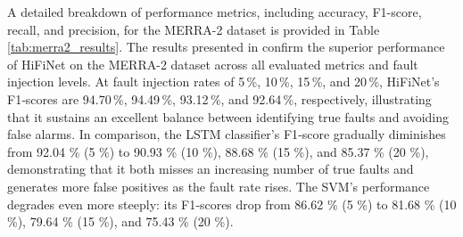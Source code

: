 A detailed breakdown of performance metrics, including accuracy, F1-score, recall, and precision, for the MERRA-2 dataset is provided in Table \ref{tab:merra2_results}. The results presented in confirm the superior performance of HiFiNet on the MERRA-2 dataset across all evaluated metrics and fault injection levels. At fault injection rates of 5\,\%, 10\,\%, 15\,\%, and 20\,\%, HiFiNet’s F1‐scores are 94.70\,\%, 94.49\,\%, 93.12\,\%, and 92.64\,\%, respectively, illustrating that it sustains an excellent balance between identifying true faults and avoiding false alarms. In comparison, the LSTM classifier’s F1‐score gradually diminishes from 92.04 \% (5 \%) to 90.93 \% (10 \%), 88.68 \% (15 \%), and 85.37 \% (20 \%), demonstrating that it both misses an increasing number of true faults and generates more false positives as the fault rate rises. The SVM’s performance degrades even more steeply: its F1‐scores drop from 86.62 \% (5 \%) to 81.68 \% (10 \%), 79.64 \% (15 \%), and 75.43 \% (20 \%).

